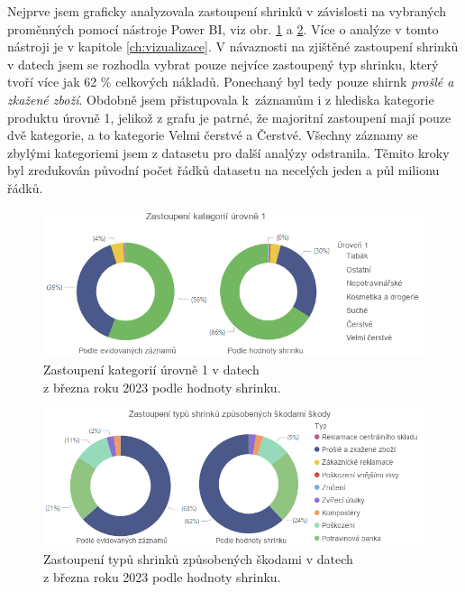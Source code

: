 Nejprve jsem graficky analyzovala zastoupení shrinků v závislosti na vybraných proměnných pomocí nástroje Power BI, viz obr. \ref*{obr:rok:g:zastoupeni1} a \ref*{obr:rok:g:zastoupenish1}. Více o analýze v tomto nástroji je v kapitole \ref{ch:vizualizace}. V návaznosti na zjištěné zastoupení shrinků v datech jsem se rozhodla vybrat pouze nejvíce zastoupený typ shrinku, který tvoří více jak 62 \% celkových nákladů. Ponechaný byl tedy pouze shirnk \emph{prošlé a zkažené zboží}. Obdobně jsem přistupovala k~záznamům i z hlediska kategorie produktu úrovně 1, jelikož z grafu je patrné, že majoritní zastoupení mají pouze dvě kategorie, a to kategorie Velmi čerstvé a Čerstvé. Všechny záznamy se zbylými kategoriemi jsem z datasetu pro další analýzy odstranila. Těmito kroky byl zredukován původní počet řádků datasetu na %
necelých jeden a půl milionu řádků.

\begin{figure}[hbtp!]
    \centering
    \captionsetup{justification=centering}
    \includegraphics[width=\textwidth]{obrazky/grafy/zastoupeniL1.png}
    \caption{Zastoupení kategorií úrovně 1 v datech \\ z března roku 2023 podle hodnoty shrinku.}
    \label{obr:rok:g:zastoupeni1}
\end{figure}

\begin{figure}[hbtp!]
    \centering
    \captionsetup{justification=centering}
    \includegraphics[width=\textwidth]{obrazky/grafy/zastoupenishrinky.png}
    \caption{Zastoupení typů shrinků způsobených škodami v datech \\ z března roku 2023 podle hodnoty shrinku.}
    \label{obr:rok:g:zastoupenish1}
\end{figure}

